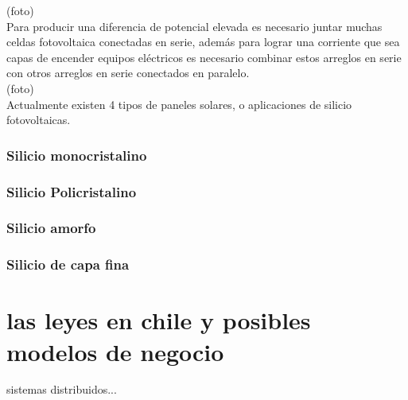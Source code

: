 (foto)\\

Para producir una diferencia de potencial elevada es necesario juntar muchas celdas fotovoltaica conectadas en serie, además para lograr una corriente que sea capas de encender equipos eléctricos es necesario combinar estos arreglos en serie con otros arreglos en serie conectados en paralelo.\\

(foto)\\

Actualmente existen 4 tipos de paneles solares, o aplicaciones de silicio fotovoltaicas.\\
\subsubsection{Silicio monocristalino}
\subsubsection{Silicio Policristalino}
\subsubsection{Silicio amorfo}
\subsubsection{Silicio de capa fina}

\section{las leyes en chile y posibles modelos de negocio}
sistemas distribuidos...

